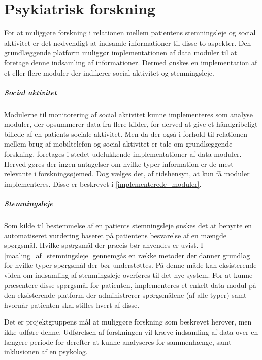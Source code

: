 \chapter{Psykiatrisk forskning}\label{problem}
For at muliggøre forskning i relationen mellem patientens stemningsleje og social aktivitet er det nødvendigt at indsamle informationer til disse to aspekter.
Den grundlæggende platform muliggør implementationen af data moduler  til at foretage denne indsamling af informationer.
Dermed ønskes en implementation af et eller flere moduler der indikerer social aktivitet og stemningsleje.

\paragraph{Social aktivitet}
Modulerne til monitorering af social aktivitet kunne implementeres som analyse moduler, der opsummerer data fra flere kilder, for derved at give et håndgribeligt billede af en patients sociale aktivitet.
Men da der også i forhold til relationen mellem brug af mobiltelefon og social aktivitet er tale om grundlæggende forskning, foretages i stedet udelukkende implementationer af data moduler.
Herved gøres der ingen antagelser om hvilke typer information er de mest relevante i forskningsøjemed.
Dog vælges det, af tidshensyn, at kun få moduler implementeres.
Disse er beskrevet i \cref{implementerede_moduler}.

\paragraph{Stemningsleje}
Som kilde til bestemmelse af en patients stemningsleje ønskes det at benytte en automatiseret vurdering baseret på patientens besvarelse af en mængde spørgsmål.
Hvilke spørgsmål der præcis bør anvendes er uvist.
I \cref{maaling_af_stemningsleje} gennemgås en række metoder der danner grundlag for hvilke typer spørgsmål der bør understøttes.
På denne måde kan eksisterende viden om indsamling af stemningsleje overføres til det nye system.
For at kunne præsentere disse spørgsmål for patienten, implementeres et enkelt data modul på den eksisterende platform\citefaelles{} der administrerer spørgsmålene (af alle typer) samt hvornår patienten skal stilles hvert af disse.

Det er projektgruppens mål at muliggøre forskning som beskrevet herover, men ikke udføre denne.
Udførelsen af forskningen vil kræve indsamling af data over en længere periode for derefter at kunne analyseres for sammenhænge, samt inklusionen af en psykolog.

